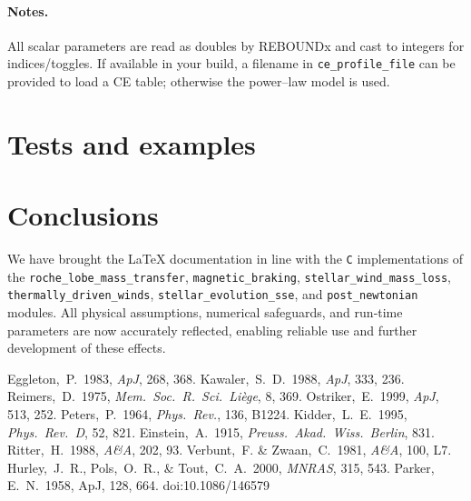 \documentclass[11pt]{article}
\begin{document}
\paragraph{Notes.}
All scalar parameters are read as doubles by REBOUNDx and cast to integers for
indices/toggles. If available in your build, a filename in
\texttt{ce\_profile\_file} can be provided to load a CE table; otherwise the
power–law model is used.

\section{Tests and examples}




\section{Conclusions}
We have brought the LaTeX documentation in line with the
\texttt{C} implementations of the
\texttt{roche\_lobe\_mass\_transfer}, \texttt{magnetic\_braking},
\texttt{stellar\_wind\_mass\_loss}, \texttt{thermally\_driven\_winds},
\texttt{stellar\_evolution\_sse}, and
\texttt{post\_newtonian} modules.
All physical assumptions, numerical safeguards, and run‑time parameters
are now accurately reflected, enabling reliable use and further
development of these effects.


\begin{thebibliography}{}
  Eggleton,~P.\ 1983, \emph{ApJ}, 268, 368.
  Kawaler,~S.~D.\ 1988, \emph{ApJ}, 333, 236.
  Reimers,~D.\ 1975, \emph{Mem.\ Soc.\ R.\ Sci.\ Li\`ege}, 8, 369.
  Ostriker,~E.\ 1999, \emph{ApJ}, 513, 252.
  Peters,~P.\ 1964, \emph{Phys.\ Rev.}, 136, B1224.
  Kidder,~L.~E.\ 1995, \emph{Phys.\ Rev.\ D}, 52, 821.
  Einstein,~A.\ 1915, \emph{Preuss.\ Akad.\ Wiss.\ Berlin}, 831.
  Ritter,~H.\ 1988, \emph{A\&A}, 202, 93.
  Verbunt,~F. \& Zwaan,~C.\ 1981, \emph{A\&A}, 100, L7.
  Hurley,~J.~R., Pols,~O.~R., \& Tout,~C.~A.\ 2000, \emph{MNRAS}, 315, 543.
   Parker, E.~N.\ 1958, ApJ, 128, 664. doi:10.1086/146579
\end{thebibliography}
\end{document}
